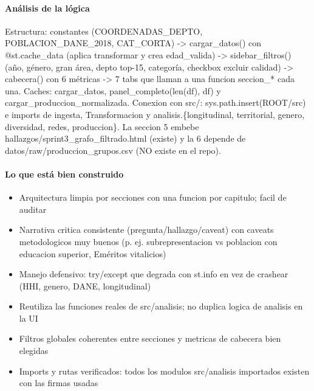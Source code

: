 \paragraph{Análisis de la lógica}
Estructura: constantes (COORDENADAS\_DEPTO, POBLACION\_DANE\_2018, CAT\_CORTA) -> cargar\_datos() con @st.cache\_data (aplica transformar y crea edad\_valida) -> sidebar\_filtros() (año, género, gran área, depto top-15, categoría, checkbox excluir calidad) -> cabecera() con 6 métricas -> 7 tabs que llaman a una funcion seccion\_* cada una. Caches: cargar\_datos, panel\_completo(len(df), df) y cargar\_produccion\_normalizada. Conexion con src/: sys.path.insert(ROOT/src) e imports de ingesta, Transformacion y analisis.\{longitudinal, territorial, genero, diversidad, redes, produccion\}. La seccion 5 embebe hallazgos/sprint3\_grafo\_filtrado.html (existe) y la 6 depende de datos/raw/produccion\_grupos.csv (NO existe en el repo).

\paragraph{Lo que está bien construido}
\begin{itemize}
  \item Arquitectura limpia por secciones con una funcion por capitulo; facil de auditar
  \item Narrativa critica consistente (pregunta/hallazgo/caveat) con caveats metodologicos muy buenos (p. ej. subrepresentacion vs poblacion con educacion superior, Eméritos vitalicios)
  \item Manejo defensivo: try/except que degrada con st.info en vez de crashear (HHI, genero, DANE, longitudinal)
  \item Reutiliza las funciones reales de src/analisis; no duplica logica de analisis en la UI
  \item Filtros globales coherentes entre secciones y metricas de cabecera bien elegidas
  \item Imports y rutas verificados: todos los modulos src/analisis importados existen con las firmas usadas
\end{itemize}

